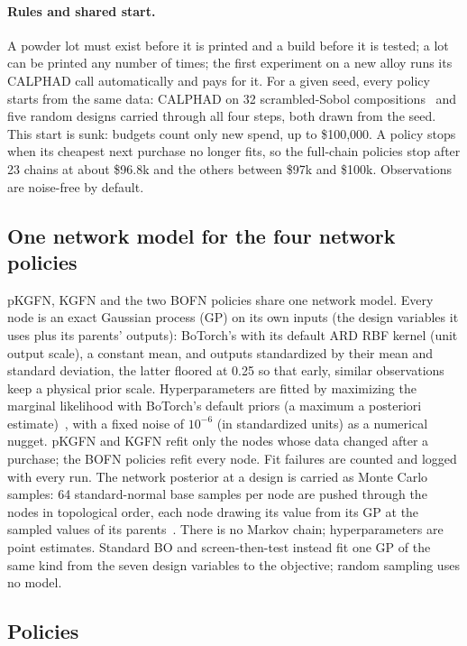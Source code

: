 \documentclass[11pt]{article}
\begin{document}
\paragraph{Rules and shared start.} A powder lot must exist before it is
printed and a build before it is tested; a lot can be printed any number of
times; the first experiment on a new alloy runs its CALPHAD call automatically
and pays for it. For a given seed, every policy starts from the same data:
CALPHAD on 32 scrambled-Sobol compositions~\cite{owen1998} and five random
designs carried through all four steps, both drawn from the seed. This start is
sunk: budgets count only new spend, up to \$100,000. A policy stops when its
cheapest next purchase no longer fits, so the full-chain policies stop after 23
chains at about \$96.8k and the others between \$97k and \$100k. Observations
are noise-free by default.

\subsection*{One network model for the four network policies}

pKGFN, KGFN and the two BOFN policies share one network model. Every node is an
exact Gaussian process (GP) on its own inputs (the design variables it uses plus
its parents' outputs): BoTorch's  with its default ARD RBF
kernel (unit output scale), a constant mean, and outputs standardized by their
mean and standard deviation, the latter floored at 0.25 so that early, similar
observations keep a physical prior scale. Hyperparameters are fitted by
maximizing the marginal likelihood with BoTorch's default priors (a maximum a
posteriori estimate)~\cite{balandat2020,gardner2018,paszke2019}, with a fixed
noise of $10^{-6}$ (in standardized units) as a numerical nugget. pKGFN and
KGFN refit only the nodes whose data changed after a purchase; the BOFN policies
refit every node. Fit failures are counted and logged with every run. The
network posterior at a design is carried as Monte Carlo samples: 64
standard-normal base samples per node are pushed through the nodes in
topological order, each node drawing its value from its GP at the sampled values
of its parents~\cite{astudillo2021}. There is no Markov chain; hyperparameters
are point estimates. Standard BO and screen-then-test instead fit one GP of the
same kind from the seven design variables to the objective; random sampling uses
no model.

\subsection*{Policies}
\end{document}
